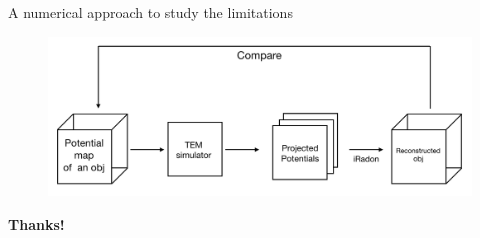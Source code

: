 \documentclass[slidestop,compress,12pt]{beamer}
\begin{document}
\begin{frame}[c]{A numerical approach to study the limitations}
    \begin{figure}
        \includegraphics[scale=0.5]{imgs/project.png}
    \end{figure}
\end{frame}

\begin{frame}[c]
\centering
\huge
\textbf{Thanks!}
\end{frame}
\end{document}
